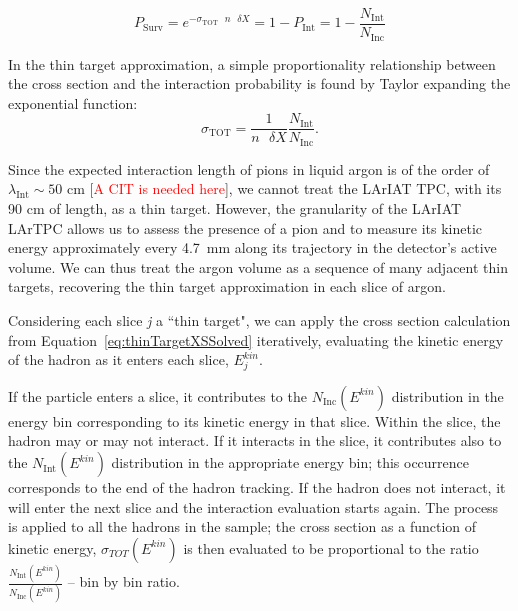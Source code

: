 \documentclass[aps,prl,twocolumn,showpacs,superscriptaddress,groupedaddress]{revtex4}  %
\begin{document}
\begin{equation}
P_{\text{Surv}} = e^{-\sigma_{\text{TOT}}\text{ } n \text{ }\delta X} = 1- P_{\text{Int}}  = 1 - \frac{N_{\text{Int}}}{N_{\text{Inc}}} 
\label{eq:thinTargetXS}
\end{equation}

In the thin target approximation,  a simple proportionality relationship between the cross section and the interaction probability is found by Taylor expanding the exponential function:
 \begin{equation}
 \sigma_{\text{TOT}}  = \frac{1}{n \text{ }\delta X}\frac{N_{\text{Int}}}{N_{\text{Inc}}}.
\label{eq:thinTargetXSSolved}
\end{equation}

Since the expected interaction length of pions in liquid argon is of the order of $\lambda_{\text{Int}} \sim 50$ cm [\textcolor{red}{A CIT is needed here}], we cannot treat the LArIAT TPC, with its 90 cm of length,  as a thin target. However, the granularity of the LArIAT LArTPC allows us to assess the presence of a pion and to measure its kinetic energy approximately every 4.7~mm along its trajectory in the detector's active volume. We can thus treat the argon volume as a sequence of many adjacent thin targets, recovering the thin target approximation in each slice of argon. 





Considering each slice {\emph{j}}  a ``thin target",  we can apply the cross section calculation from Equation~\ref{eq:thinTargetXSSolved} iteratively, evaluating the kinetic energy of the hadron as it enters each slice, $E_{j}^{kin}$.  





If the particle enters a slice, it contributes to the $N_{\text{Inc}}( E^{kin})$ distribution in the energy bin corresponding to its kinetic energy in that slice.  Within the slice, the hadron may or may not interact. If it interacts in the slice, it  contributes also to the $N_{\text{Int}}(E^{kin})$ distribution in the appropriate energy bin; this occurrence corresponds to the end of the hadron tracking. If the hadron does not interact, it will enter the next slice and the interaction evaluation starts again.
The process is applied to all the hadrons in the sample; the cross section as a function of kinetic energy, $\sigma_{TOT}( E^{kin})$ is then evaluated to be proportional to the ratio $\frac{N_{\text{Int}}( E^{kin})}{N_{\text{Inc}}( E^{kin})}$ -- bin by bin ratio. 
\end{document}

